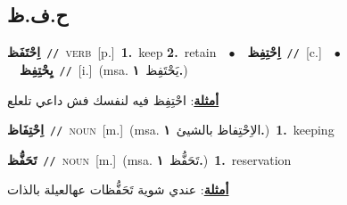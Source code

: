 \documentclass[10pt,a4paper,twoside]{article} %
\begin{document}
\begin{multicols}{2}
\vspace{-3mm}
\subsection*{\color{blue}\foreignlanguage{arabic}{ح.ف.ظ}\color{blue}{}} 

{\setlength\topsep{0pt}\textbf{\foreignlanguage{arabic}{اِحْتَفَظ}}\ {\color{gray}\texttt{//}\color{black}}\ \textsc{verb}\ [p.]\ \textbf{1.}~keep  \textbf{2.}~retain\ \ $\bullet$\ \ \setlength\topsep{0pt}\textbf{\foreignlanguage{arabic}{اِحْتِفِظ}}\ {\color{gray}\texttt{//}\color{black}}\ [c.]\ \ $\bullet$\ \ \setlength\topsep{0pt}\textbf{\foreignlanguage{arabic}{يِحْتِفِظ}}\ {\color{gray}\texttt{//}\color{black}}\ [i.]\ \color{gray}(msa. \foreignlanguage{arabic}{يَحْتَفِظ}~\foreignlanguage{arabic}{\textbf{١.}})\color{black}\  \begin{flushright}\color{gray}\foreignlanguage{arabic}{\textbf{\underline{\foreignlanguage{arabic}{أمثلة}}}: احْتِفِظ فيه لنفسك فش داعي تلعلع}\end{flushright}\color{black}} \vspace{2mm}

{\setlength\topsep{0pt}\textbf{\foreignlanguage{arabic}{اِحْتِفَاظ}}\ {\color{gray}\texttt{//}\color{black}}\ \textsc{noun}\ [m.]\ \color{gray}(msa. \foreignlanguage{arabic}{الاِحْتِفاظ بالشيئ}~\foreignlanguage{arabic}{\textbf{١.}})\color{black}\ \textbf{1.}~keeping\ } \vspace{2mm}

{\setlength\topsep{0pt}\textbf{\foreignlanguage{arabic}{تَحَفُّظ}}\ {\color{gray}\texttt{//}\color{black}}\ \textsc{noun}\ [m.]\ \color{gray}(msa. \foreignlanguage{arabic}{تَحَفُّظ}~\foreignlanguage{arabic}{\textbf{١.}})\color{black}\ \textbf{1.}~reservation\  \begin{flushright}\color{gray}\foreignlanguage{arabic}{\textbf{\underline{\foreignlanguage{arabic}{أمثلة}}}: عندي شوية تَحَفُّظات عهالعيلة بالذات}\end{flushright}\color{black}} \vspace{2mm}


\end{multicols}
\end{document}
